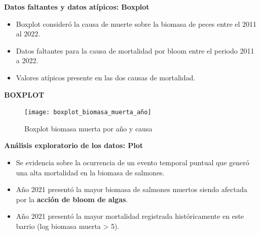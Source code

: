 \documentclass[
  ignorenonframetext,
]{beamer}
\begin{document}
\begin{frame}{\textbf{Datos faltantes y datos atípicos: Boxplot}}
\protect\hypertarget{datos-faltantes-y-datos-atuxedpicos-boxplot}{}
\begin{itemize}
\item
  Boxplot consideró la causa de muerte sobre la biomasa de peces entre
  el 2011 al 2022.
\item
  Datos faltantes para la causa de mortalidad por bloom entre el periodo
  2011 a 2022.
\item
  Valores atípicos presente en las dos causas de mortalidad.
\end{itemize}
\end{frame}

\begin{frame}{\textbf{BOXPLOT}}
\protect\hypertarget{boxplot}{}
\begin{figure}

{\centering \texttt{[image: boxplot\_biomasa\_muerta\_año]} 

}

\caption{Boxplot biomasa muerta por año y causa}\label{fig:unnamed-chunk-2}
\end{figure}
\end{frame}

\begin{frame}{\textbf{Análisis exploratorio de los datos: Plot}}
\protect\hypertarget{anuxe1lisis-exploratorio-de-los-datos-plot}{}
\begin{itemize}
\item
  Se evidencia sobre la ocurrencia de un evento temporal puntual que
  generó una alta mortalidad en la biomasa de salmones.
\item
  Año 2021 presentó la mayor biomasa de salmones muertos siendo afectada
  por la \textbf{acción de bloom de algas}.
\item
  Año 2021 presentó la mayor mortalidad registrada históricamente en
  este barrio (log biomasa muerta \textgreater{} 5).
\end{itemize}
\end{frame}
\end{document}
